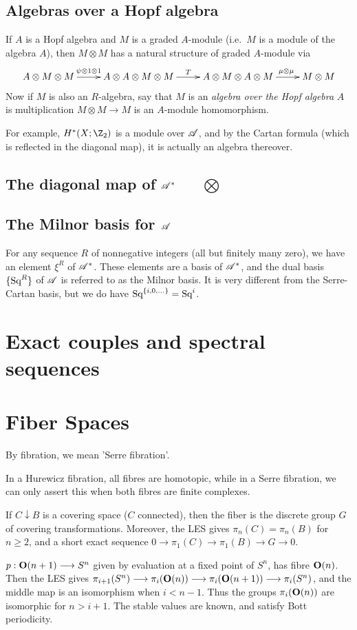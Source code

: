\documentclass[11pt]{article}
\begin{document}
{\subsection{Algebras over a Hopf algebra}
If $A$ is a Hopf algebra and $M$ is a graded $A$-module (i.e.\ $M$ is a module of the algebra $A$), then $M\otimes M$ has a natural structure of graded $A$-module via
\[\xymatrix{
A\otimes M\otimes M\ar[r]^{\psi\otimes1\otimes1\ \ \ }&A\otimes A\otimes M\otimes M\ar[r]^T&A\otimes M\otimes A\otimes M\ar[r]^{\qquad\mu\otimes \mu\ }&M\otimes M
}\]
Now if $M$ is also an $R$-algebra, say that $M$ is an \emph{algebra over the Hopf algebra} $A$ is multiplication $M\otimes M\to M$ is an $A$-module homomorphism.

For example, $H^*(X;\Z_2)$ is a module over $\mathscr{A}$, and by the Cartan formula (which is reflected in the diagonal map), it is actually an algebra thereover.
\subsection{The diagonal map of \texorpdfstring{$\mathscr{A}^*$\ \ \ $\bigotimes$}{A}}
\subsection{The Milnor basis for \texorpdfstring{$\mathscr{A}$}{A}}
For any sequence $R$ of nonnegative integers (all but finitely many zero), we have an element $\xi^R$ of $\mathscr{A}^*$. These elements are a basis of $\mathscr{A}^*$, and the dual basis $\{\textup{Sq}^R\}$ of $\mathscr{A}$ is referred to as the Milnor basis. It is very different from the Serre-Cartan basis, but we do have $\textup{Sq}^{\{i,0,\ldots\}}=\textup{Sq}^i$.

\section{Exact couples and spectral sequences}

\section{Fiber Spaces}
\begin{itemise}
\item By fibration, we mean 'Serre fibration'.
\item In a Hurewicz fibration, all fibres are homotopic, while in a Serre fibration, we can only assert this when both fibres are finite complexes.
\item If $C\downarrow B$ is a covering space ($C$ connected), then the fiber is the discrete group $G$ of covering transformations. Moreover, the LES gives $\pi_n(C)=\pi_n(B)$ for $n\geq2$, and a short exact sequence $0\to\pi_1(C)\to\pi_1(B)\to G\to0$.
\item $p:\textup{\textbf{O}}(n+1)\longrightarrow S^n$ given by evaluation at a fixed point of $S^n$, has fibre $\textup{\textbf{O}}(n)$. Then the LES gives $\pi_{i+1}(S^n)\longrightarrow\pi_i(\textup{\textbf{O}}(n))\longrightarrow\pi_i(\textup{\textbf{O}}(n+1))\longrightarrow\pi_i(S^n)$, and the middle map is an isomorphism when $i<n-1$. Thus the groups $\pi_i(\textup{\textbf{O}}(n))$ are isomorphic for $n>i+1$. The stable values are known, and satisfy Bott periodicity.
\end{itemise}
\setcounter{subsection}{3}
}
\end{document}

